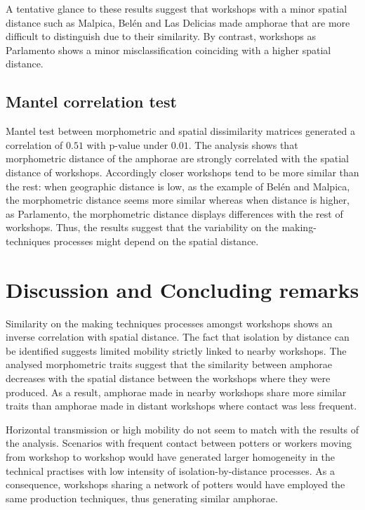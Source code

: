 \documentclass[review]{elsarticle}
\begin{document}
A tentative glance to these results suggest that workshops with a minor spatial distance such as Malpica, Belén and Las Delicias made amphorae that are more difficult to distinguish due to their similarity. By contrast, workshops as Parlamento shows a minor misclassification coinciding with a higher spatial distance. 

\subsection{Mantel correlation test}

Mantel test between morphometric and spatial dissimilarity matrices generated a correlation of $0.51$ with p-value under $0.01$. The analysis shows that morphometric distance of the amphorae are strongly correlated with the spatial distance of workshops. Accordingly closer workshops tend to be more similar than the rest: when geographic distance is low, as the example of Belén and Malpica, the morphometric distance seems more similar whereas when distance is higher, as Parlamento, the morphometric distance displays differences with the rest of workshops. Thus, the results suggest that the variability on the making-techniques processes might depend on the spatial distance.   

\section{Discussion and Concluding remarks}

Similarity on the making techniques processes amongst workshops shows an inverse correlation with spatial distance. The fact that isolation by distance can be identified suggests limited mobility strictly linked to nearby workshops. The analysed morphometric traits suggest that the similarity between amphorae decreases with the spatial distance between the workshops where they were produced. As a result, amphorae made in nearby workshops share more similar traits than amphorae made in distant workshops where contact was less frequent. 

Horizontal transmission or high mobility do not seem to match with the results of the analysis. Scenarios with frequent contact between potters or workers moving from workshop to workshop would have generated larger homogeneity in the technical practises with low intensity of isolation-by-distance processes. As a consequence, workshops sharing a network of potters would have employed the same production techniques, thus generating similar amphorae. 
\end{document}
